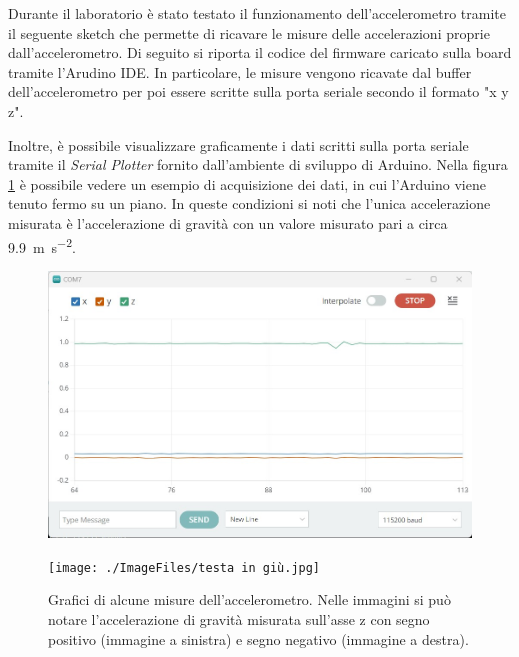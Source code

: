Durante il laboratorio è stato testato il funzionamento dell'accelerometro tramite il seguente sketch che permette di ricavare le misure delle accelerazioni proprie dall'accelerometro. Di seguito si riporta il codice del firmware caricato sulla board tramite l'Arudino IDE. In particolare, le misure vengono ricavate dal buffer dell'accelerometro per poi essere scritte sulla porta seriale secondo il formato "{x} {y} {z}".


Inoltre, è possibile visualizzare graficamente i dati scritti sulla porta seriale tramite il \textit{Serial Plotter} fornito dall'ambiente di sviluppo di Arduino. Nella figura \ref{fig:serial_plotter} è possibile vedere un esempio di acquisizione dei dati, in cui l'Arduino viene tenuto fermo su un piano. In queste condizioni si noti che l'unica accelerazione misurata è l'accelerazione di gravità con un valore misurato pari a circa \SI{9.9}{\meter \per \second^2}.
\begin{figure}[tbh]
	\centering
	\begin{minipage}{.45\textwidth}
		\includegraphics[width=\linewidth]{./ImageFiles/fermo.jpg}
	\end{minipage}
	\begin{minipage}{.45\textwidth}
		\texttt{[image: ./ImageFiles/testa in giù.jpg]}
	\end{minipage}
	\caption{Grafici di alcune misure dell'accelerometro. Nelle immagini si può notare l'accelerazione di gravità misurata sull'asse z con segno positivo (immagine a sinistra) e segno negativo (immagine a destra).}
	\label{fig:serial_plotter}
\end{figure}

